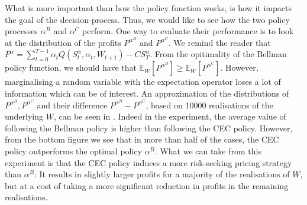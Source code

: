\documentclass[main.tex]{subfiles}
\begin{document}
What is more important than how the policy function works, is how it
impacts the goal of the decision-process. Thus, we would like to see
how the two policy processes $\alpha^B$ and $\alpha^C$ perform.
One way to evaluate their performance is to look at
the distribution of the profits $P^{\alpha^B}$ and $P^{\alpha^C}$.
We remind the reader that
$P^\alpha =
\sum_{t=0}^{T-1}\alpha_tQ(S_t^\alpha,\alpha_t,W_{t+1})-CS_T^\alpha$.
From the opitimality of the Bellman policy function, we should have
that $\mathbb E_W[P^{\alpha^B}]\geq \mathbb E_W[P^{\alpha^C}]$.
However, marginalising a random variable with the expectation operator
loses a lot of information which can be of interest.
An approximation of the distributions of $P^{\alpha^B}, P^{\alpha^C}$
and their difference
$P^{\alpha^B}-P^{\alpha^C}$, based on \num{10000} realisations of the
underlying $W$, can be seen in .
Indeed in the experiment, the average value of following the
Bellman policy is higher than following the CEC policy.
However, from the bottom figure we see that
in more than half of the cases, the CEC policy outperforms the optimal
policy $\alpha^B$. What we can take from this experiment is that
the CEC policy induces a more risk-seeking pricing strategy than
$\alpha^B$: It results in slightly larger profits for a majority of the
realisations of $W$, but at a cost of taking a more significant
reduction in
profits in the remaining realisations.
\end{document}
